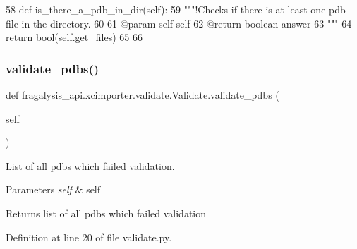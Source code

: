 \begin{DoxyCode}
58     \textcolor{keyword}{def }is\_there\_a\_pdb\_in\_dir(self):
59         \textcolor{stringliteral}{"""!Checks if there is at least one pdb file in the directory.}
60 \textcolor{stringliteral}{}
61 \textcolor{stringliteral}{        @param self self}
62 \textcolor{stringliteral}{        @return boolean answer}
63 \textcolor{stringliteral}{        """}
64         \textcolor{keywordflow}{return} bool(self.get\_files)
65 
66 
\end{DoxyCode}
\mbox{\label{classfragalysis__api_1_1xcimporter_1_1validate_1_1_validate_a1e2236300274a3e4c91944ff8a10f432}} 
\subsubsection{\texorpdfstring{validate\+\_\+pdbs()}{validate\_pdbs()}\hspace{0.1cm}{\footnotesize\ttfamily [1/2]}}
{\footnotesize\ttfamily def fragalysis\+\_\+api.\+xcimporter.\+validate.\+Validate.\+validate\+\_\+pdbs (\begin{DoxyParamCaption}\item[{}]{self }\end{DoxyParamCaption})}



List of all pdbs which failed validation. 


\begin{DoxyParams}{Parameters}
{\em self} & self \\
\hline
\end{DoxyParams}
\begin{DoxyReturn}{Returns}
list of all pdbs which failed validation 
\end{DoxyReturn}


Definition at line 20 of file validate.\+py.


